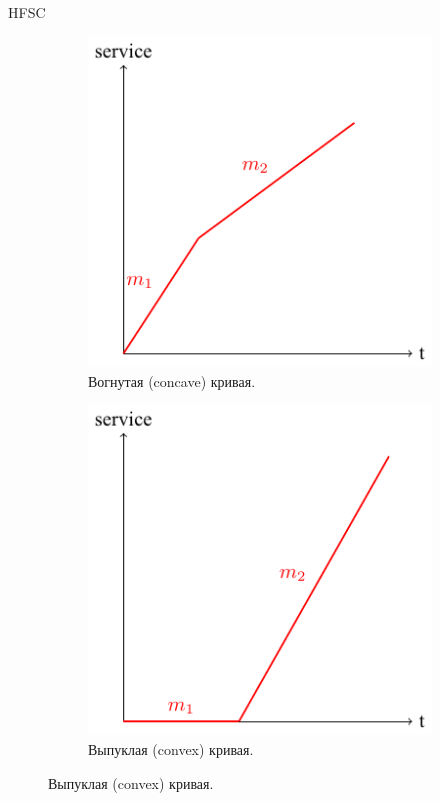 \documentclass[12pt]{beamer}
\begin{document}
\begin{frame}{HFSC}

\begin{figure}
  \begin{subfigure}[b]{0.3\textwidth}
     \includegraphics[width=\textwidth]{../text/src/pdfimages/hfsc_concave.pdf}
    \caption*{{\scriptsize Вогнутая (concave) кривая.}}
    \label{fig:f1}
  \end{subfigure}
  \hspace{0.2\textwidth}
  \begin{subfigure}[b]{0.3\textwidth}
    \includegraphics[width=\textwidth]{../text/src/pdfimages/hfsc_convex.pdf}
    \caption*{{\scriptsize Выпуклая (convex) кривая.}}
    \label{fig:f2}
  \end{subfigure}
\end{figure}



\end{frame}
\end{document}
